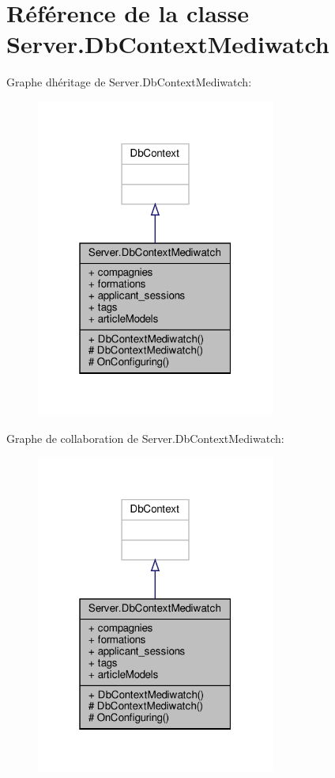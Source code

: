 \hypertarget{class_server_1_1_db_context_mediwatch}{}\section{Référence de la classe Server.\+Db\+Context\+Mediwatch}
\label{class_server_1_1_db_context_mediwatch}


Graphe d\textquotesingle{}héritage de Server.\+Db\+Context\+Mediwatch\+:
\nopagebreak
\begin{figure}[H]
\begin{center}
\leavevmode
\includegraphics[width=223pt]{class_server_1_1_db_context_mediwatch__inherit__graph}
\end{center}
\end{figure}


Graphe de collaboration de Server.\+Db\+Context\+Mediwatch\+:
\nopagebreak
\begin{figure}[H]
\begin{center}
\leavevmode
\includegraphics[width=223pt]{class_server_1_1_db_context_mediwatch__coll__graph}
\end{center}
\end{figure}
